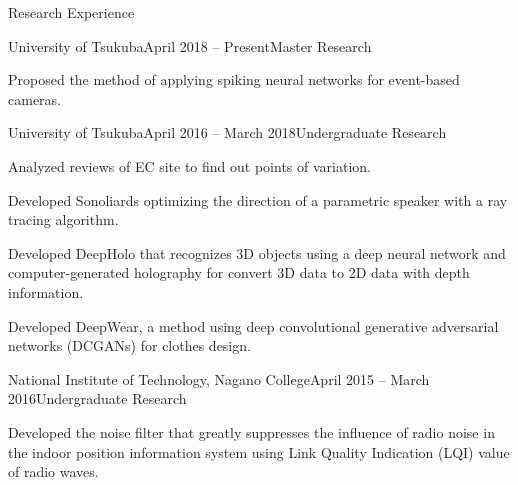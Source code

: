 \documentclass{resume} %
\begin{document}
\begin{rSection}{Research Experience}

    \begin{rSubsection}{University of Tsukuba}{April 2018 -- Present}{Master Research}{}
    \item Proposed the method of applying spiking neural networks for event-based cameras.
    \end{rSubsection}

    \begin{rSubsection}{University of Tsukuba}{April 2016 -- March 2018}{Undergraduate Research}{}
    \item Analyzed reviews of EC site to find out points of variation.
    \item Developed Sonoliards optimizing the direction of a parametric speaker with a ray tracing algorithm.
    \item Developed DeepHolo that recognizes 3D objects using a deep neural network and computer-generated holography for convert 3D data to 2D data with depth information.
    \item Developed DeepWear, a method using deep convolutional generative adversarial networks (DCGANs) for clothes design.
    \end{rSubsection}

    \begin{rSubsection}{National Institute of Technology, Nagano College}{April 2015 -- March 2016}{Undergraduate Research}{}
    \item Developed the noise filter that greatly suppresses the influence of radio noise in the indoor position information system using Link Quality Indication (LQI) value of radio waves.
    \end{rSubsection}

\end{rSection}

\end{document}
